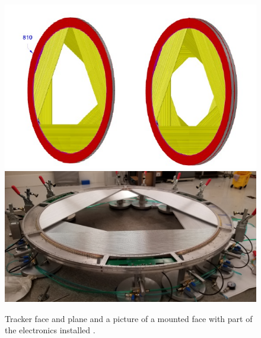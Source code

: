 \documentclass[12pt,a4paper,openright, oneside, titlepage]{book} %
\begin{document}
\begin{figure}[h!]
\centering
\includegraphics[scale=0.3]{Tracker_plane}
\includegraphics[scale=0.35]{Tracker_plane_picture}
\caption[Face and Plane of the tracker]{Tracker face and plane \cite{MTDR} and a picture of a mounted face with part of the electronics installed \cite{Manolis}.}
\label{_Tracker_plane}
\end{figure}
\end{document}
